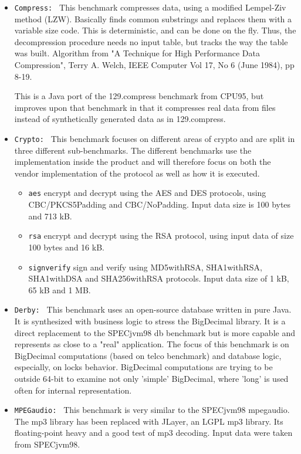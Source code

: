 \begin{itemize}
  \item \texttt{Compress: } This benchmark compresses data, using a modified Lempel-Ziv method (LZW). Basically finds common substrings and replaces them with a variable size code. This is deterministic, and can be done on the fly. Thus, the decompression procedure needs no input table, but tracks the way the table was built. Algorithm from "A Technique for High Performance Data Compression", Terry A. Welch, IEEE Computer Vol 17, No 6 (June 1984), pp 8-19.

This is a Java port of the 129.compress benchmark from CPU95, but improves upon that benchmark in that it compresses real data from files instead of synthetically generated data as in 129.compress. 
 \item \texttt{Crypto: } This benchmark focuses on different areas of crypto and are split in three different sub-benchmarks. The different benchmarks use the implementation inside the product and will therefore focus on both the vendor implementation of the protocol as well as how it is executed.
  \begin{itemize}
    \item \texttt{aes} encrypt and decrypt using the AES and DES protocols, using CBC/PKCS5Padding and CBC/NoPadding. Input data size is 100 bytes and 713 kB.
    \item \texttt{rsa} encrypt and decrypt using the RSA protocol, using input data of size 100 bytes and 16 kB.
    \item \texttt{signverify} sign and verify using MD5withRSA, SHA1withRSA, SHA1withDSA and SHA256withRSA protocols. Input data size of 1 kB, 65 kB and 1 MB.
  \end{itemize}
\item \texttt{Derby: } This benchmark uses an open-source database written in pure Java. It is synthesized with business logic to stress the BigDecimal library. It is a direct replacement to the SPECjvm98 db benchmark but is more capable and represents as close to a "real" application. The focus of this benchmark is on BigDecimal computations (based on telco benchmark) and database logic, especially, on locks behavior. BigDecimal computations are trying to be outside 64-bit to examine not only 'simple' BigDecimal, where 'long' is used often for internal representation. 
\item \texttt{MPEGaudio: } This benchmark is very similar to the SPECjvm98 mpegaudio. The mp3 library has been replaced with JLayer, an LGPL mp3 library. Its floating-point heavy and a good test of mp3 decoding. Input data were taken from SPECjvm98.

\end{itemize}
